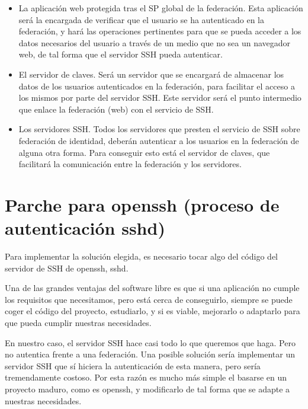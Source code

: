     \begin{itemize}
        
        \item La aplicación web protegida tras el SP global de la
        federación. Esta aplicación será la encargada de verificar que el
        usuario se ha autenticado en la federación, y hará las operaciones
        pertinentes para que se pueda acceder a los datos necesarios del
        usuario a través de un medio que no sea un navegador web, de tal
        forma que el servidor SSH pueda autenticar.

        \item El servidor de claves. Será un servidor que se encargará de
        almacenar los datos de los usuarios autenticados en la federación,
        para facilitar el acceso a los mismos por parte del servidor SSH.
        Este servidor será el punto intermedio que enlace la federación
        (web) con el servicio de SSH.

        \item Los servidores SSH. Todos los servidores que presten el
        servicio de SSH sobre federación de identidad, deberán autenticar a
        los usuarios en la federación de alguna otra forma. Para
        conseguir esto está el servidor de claves, que facilitará la
        comunicación entre la federación y los servidores.

    \end{itemize}

    \section{Parche para openssh (proceso de autenticación sshd)}
    \label{openssh}

    Para implementar la solución elegida, es necesario tocar algo del
    código del servidor de SSH de openssh, sshd.

    Una de las grandes ventajas del software libre es que si una aplicación
    no cumple los requisitos que necesitamos, pero está cerca de
    conseguirlo, siempre se puede coger el código del proyecto, estudiarlo,
    y si es viable, mejorarlo o adaptarlo para que pueda cumplir nuestras
    necesidades.

    En nuestro caso, el servidor SSH hace casi todo lo que queremos que
    haga. Pero no autentica frente a una federación. Una posible solución
    sería implementar un servidor SSH que sí hiciera la autenticación de
    esta manera, pero sería tremendamente costoso. Por esta razón es mucho
    más simple el basarse en un proyecto maduro, como es openssh, y
    modificarlo de tal forma que se adapte a nuestras necesidades.


